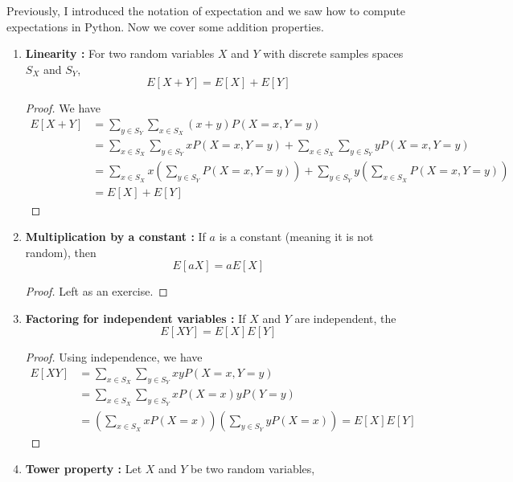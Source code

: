   Previously, I introduced the notation of expectation and we saw how to compute expectations in Python. Now we cover some addition properties. 
  \begin{enumerate}
  \item {\bf Linearity  \cite[Theorem 3.1.2]{evans}:} For two random variables $X$ and $Y$ with discrete samples spaces $S_X$ and $S_Y$, 
  \begin{equation*}
  E[X+Y] = E[X]+E[Y]
  \end{equation*}
  \begin{proof} We have 
  \begin{align*}
  E[X+Y] &= \sum_{y \in S_Y}\sum_{x\in S_X} (x+y)P(X=x,Y=y) \\
  &= \sum_{x \in S_X} \sum_{y \in S_Y} xP(X=x,Y=y)  +  \sum_{x \in S_X} \sum_{y \in S_Y} yP(X=x,Y=y) \\
  &= \sum_{x \in S_X} x\left( \sum_{y \in S_Y}P(X=x,Y=y)  \right)+   \sum_{y \in S_Y} y\left( \sum_{x \in S_X} P(X=x,Y=y)\right) \\
  &= E[X] + E[Y]
  \end{align*}
  \end{proof}
    \item {\bf Multiplication by a constant \cite[Theorem 3.1.2]{evans}:} If $a$ is a constant (meaning it is not random), then 
    \begin{equation*}
      E[aX] =  a E[X]
    \end{equation*}
     \begin{proof}  Left as an exercise. 
     \end{proof}
  \item \label{prop:ind}  {\bf Factoring for independent variables \cite[Theorem 3.1.3]{evans}:} If $X$ and $Y$ are independent, the 
  \begin{equation*}
  E[XY]=E[X]E[Y]
  \end{equation*}
    \begin{proof} Using independence, we have 
    \begin{align*}
     E[XY] &= \sum_{x \in S_X}\sum_{y \in S_Y} xy P(X=x,Y=y)  \\
     &= \sum_{x \in S_X}\sum_{y \in S_Y} xP(X=x)yP(Y=y) \\
     &= \left( \sum_{x \in S_X} xP(X=x)\right)\left( \sum_{y \in S_Y} yP(X=x)\right)= E[X]E[Y]
    \end{align*}
    \end{proof}
    \item {\bf Tower property \cite[Theorem 3.5.2]{evans}:} Let $X$ and $Y$ be two random variables,  

\end{enumerate}
